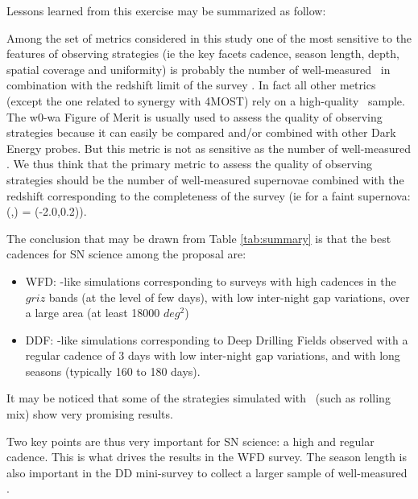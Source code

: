 \noindent Lessons learned from this exercise may be summarized as follow:


Among the set of metrics considered in this study one of the most sensitive to the features of observing strategies (ie the key facets cadence, season length, depth, spatial coverage and uniformity) is probably the number of well-measured \sne~in combination with the redshift limit of the survey \zlimit. In fact all other metrics (except the one related to synergy with 4MOST) rely on a high-quality \sne~sample. The w0-wa Figure of Merit is usually used to assess the quality of observing strategies because it can easily be compared and/or combined with other Dark Energy probes. But this metric is not as sensitive as the number of well-measured \sne. We thus think that the primary metric to assess the quality of observing strategies should be the number of well-measured supernovae combined with the redshift corresponding to the completeness of the survey (ie for a faint supernova: (\strech,\sncolor) = (-2.0,0.2)).



The conclusion that may be drawn from Table \ref{tab:summary} is that the best cadences for SN science among the proposal are:
\begin{itemize}
\item WFD: \altsched-like simulations corresponding to surveys with high cadences in the $griz$ bands (at the level of few days), with low inter-night gap variations, over a large area (at least 18000 $deg^2$) 

\item DDF: \feature-like simulations corresponding to Deep Drilling Fields observed with a regular cadence of 3 days with low inter-night gap variations, and with long seasons (typically 160 to 180 days). 
\end{itemize}

It may be noticed that some of the strategies simulated with \slair~(such as rolling mix) show very promising results.

Two key points are thus very important for SN science: a high and regular cadence. This is what drives the results in the WFD survey. The season length is also important in the DD mini-survey to collect a larger sample of well-measured \sne. 


